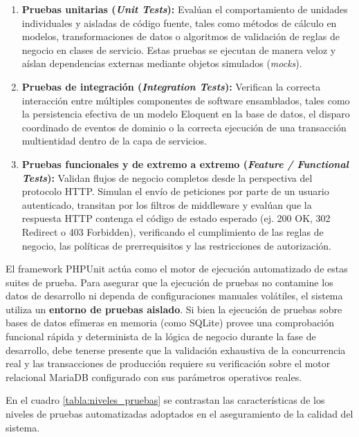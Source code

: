 \begin{enumerate}
    \item \textbf{Pruebas unitarias (\textit{Unit Tests}):} Evalúan el comportamiento de unidades individuales y aisladas de código fuente, tales como métodos de cálculo en modelos, transformaciones de datos o algoritmos de validación de reglas de negocio en clases de servicio. Estas pruebas se ejecutan de manera veloz y aíslan dependencias externas mediante objetos simulados (\textit{mocks}).
    \item \textbf{Pruebas de integración (\textit{Integration Tests}):} Verifican la correcta interacción entre múltiples componentes de software ensamblados, tales como la persistencia efectiva de un modelo Eloquent en la base de datos, el disparo coordinado de eventos de dominio o la correcta ejecución de una transacción multientidad dentro de la capa de servicios.
    \item \textbf{Pruebas funcionales y de extremo a extremo (\textit{Feature / Functional Tests}):} Validan flujos de negocio completos desde la perspectiva del protocolo HTTP. Simulan el envío de peticiones por parte de un usuario autenticado, transitan por los filtros de middleware y evalúan que la respuesta HTTP contenga el código de estado esperado (ej. 200 OK, 302 Redirect o 403 Forbidden), verificando el cumplimiento de las reglas de negocio, las políticas de prerrequisitos y las restricciones de autorización.
\end{enumerate}

El framework PHPUnit actúa como el motor de ejecución automatizado de estas suites de prueba. Para asegurar que la ejecución de pruebas no contamine los datos de desarrollo ni dependa de configuraciones manuales volátiles, el sistema utiliza un \textbf{entorno de pruebas aislado}. Si bien la ejecución de pruebas sobre bases de datos efímeras en memoria (como SQLite) provee una comprobación funcional rápida y determinista de la lógica de negocio durante la fase de desarrollo, debe tenerse presente que la validación exhaustiva de la concurrencia real y las transacciones de producción requiere su verificación sobre el motor relacional MariaDB configurado con sus parámetros operativos reales.

En el cuadro \ref{tabla:niveles_pruebas} se contrastan las características de los niveles de pruebas automatizadas adoptados en el aseguramiento de la calidad del sistema.

